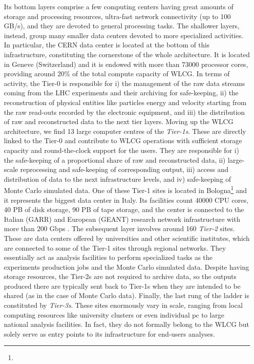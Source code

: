 Its bottom layers comprise a few computing centers having great amounts of storage and processing resources, ultra-fast network connectivity (up to 100 GB/s), and they are devoted to general processing tasks.
The shallower layers, instead, group many smaller data centers devoted to more specialized activities.
In particular, the CERN data center is located at the bottom of this infrastructure, constituting the cornerstone of the whole architecture. 
It is located in Geneve (Switzerland) and it is endowed with more than 73000 processor cores, providing around 20\% of the total compute capacity of WLCG.
In terms of activity, the Tier-0 is responsible for i) the management of the raw data streams coming from the LHC experiments and their archiving for safe-keeping, ii) the reconstruction of physical entities like particles energy and velocity starting from the raw read-outs recorded by the electronic equipment, and iii) the distribution of raw and reconstructed data to the next tier layers.
Moving up the WLCG architecture, we find 13 large computer centres of the \textit{Tier-1s}.
These are directly linked to the Tier-0 and contribute to WLCG operations with sufficient storage capacity and round-the-clock support for the users. They are responsible for i) the safe-keeping of a proportional share of raw and reconstructed data, ii) large-scale reprocessing and safe-keeping of corresponding output, iii) access and distribution of data to the next infrastructure levels, and iv) safe-keeping of Monte Carlo simulated data.
One of these Tier-1 sites is located in Bologna\footnote{\cnaf} and it represents the biggest data center in Italy. Its facilities count 40000 CPU cores, 40 PB of disk storage, 90 PB of tape storage, and the center is connected to the Italian (GARR) and European (GEANT) research network infrastructure with more than 200 Gbps \cite{cnaf2019annualrep, dell2019cnaf}.
The subsequent layer involves around 160 \textit{Tier-2} sites. These are data centers offered by universities and other scientific institutes, which are connected to some of the Tier-1 sites through regional networks. 
They essentially act as analysis facilities to perform specialized tasks as the experiments production jobs and the Monte Carlo simulated data. 
Despite having storage resources, the Tier-2s are not required to archive data, so the outputs produced there are typically sent back to Tier-1s when they are intended to be shared (as in the case of Monte Carlo data).
Finally, the last rung of the ladder is constituted by \textit{Tier-3s}. These sites enormously vary in scale,  ranging from local computing resources like university clusters or even individual pc to large national analysis facilities.
In fact, they do not formally belong to the WLCG but solely serve as entry points to its infrastructure for end-users analyses.

